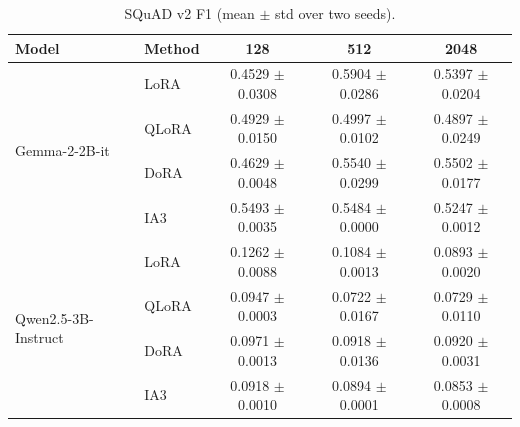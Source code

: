 \documentclass{article}
\begin{document}
\begin{table}[H]
\centering
\small
\caption{SQuAD v2 F1 (mean $\pm$ std over two seeds).}
\begin{tabular}{llccc}
\toprule
Model & Method & 128 & 512 & 2048 \\
\midrule
\multirow{4}{*}{Gemma-2-2B-it} & LoRA & 0.4529 $\pm$ 0.0308 & 0.5904 $\pm$ 0.0286 & 0.5397 $\pm$ 0.0204 \\
 & QLoRA & 0.4929 $\pm$ 0.0150 & 0.4997 $\pm$ 0.0102 & 0.4897 $\pm$ 0.0249 \\
 & DoRA & 0.4629 $\pm$ 0.0048 & 0.5540 $\pm$ 0.0299 & 0.5502 $\pm$ 0.0177 \\
 & IA3 & 0.5493 $\pm$ 0.0035 & 0.5484 $\pm$ 0.0000 & 0.5247 $\pm$ 0.0012 \\
\midrule
\multirow{4}{*}{Qwen2.5-3B-Instruct} & LoRA & 0.1262 $\pm$ 0.0088 & 0.1084 $\pm$ 0.0013 & 0.0893 $\pm$ 0.0020 \\
 & QLoRA & 0.0947 $\pm$ 0.0003 & 0.0722 $\pm$ 0.0167 & 0.0729 $\pm$ 0.0110 \\
 & DoRA & 0.0971 $\pm$ 0.0013 & 0.0918 $\pm$ 0.0136 & 0.0920 $\pm$ 0.0031 \\
 & IA3 & 0.0918 $\pm$ 0.0010 & 0.0894 $\pm$ 0.0001 & 0.0853 $\pm$ 0.0008 \\
\bottomrule
\end{tabular}
\end{table}
\end{document}

